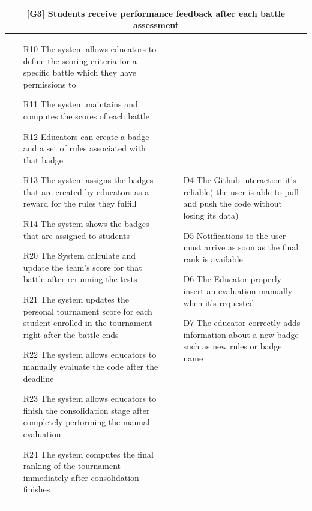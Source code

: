 \begin{enumerate}[label=\textbf{[UC\arabic*]}]
\begin{tabular}{|p{7cm}|p{7cm}|}
\hline
\multicolumn{2}{|c|}{
\textbf{[G3] Students receive performance feedback after each battle assessment}}
\\
\hline
\begin{itemize}
    \item [R10] The system allows educators to define the scoring criteria for a specific battle which they have permissions to
    \item [R11] The system maintains and computes the scores of each battle
    \item [R12] Educators can create a badge and a set of rules associated with that badge
    \item[R13] The system assigns the badges that are created by educators as a reward for the rules they fulfill
    \item [R14] The system shows the badges that are assigned to students 
    \item [R20] The System calculate and update the team's score for that battle after rerunning the tests
    \item [R21] The system updates the personal tournament score for each student enrolled in the tournament right after the battle ends
    \item [R22] The system allows educators to manually evaluate the code after the deadline
    \item [R23] The system  allows educators to finish the consolidation stage after completely performing the manual evaluation
    \item [R24] The system computes the final ranking of the tournament immediately after consolidation finishes
\end{itemize}
&
\begin{itemize}
    \item [D4] The Github interaction it's reliable( the user is able to pull and push the code without losing its data)
    \item [D5] Notifications to the user must arrive as soon as the final rank is available
    \item [D6] The Educator properly insert an evaluation manually when it’s requested
    \item [D7] The educator correctly adds information about a new badge such as new rules or badge name
\end{itemize}
\\
\hline
\end{tabular}




\end{enumerate}
